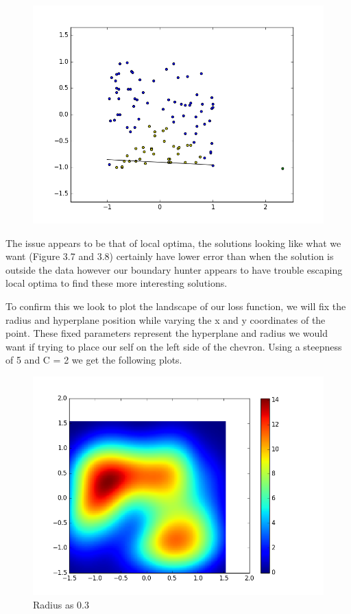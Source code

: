 \documentclass[notitlepage]{report}
\theoremstyle{definition}
\begin{document}
\begin{figure}[H]
  \centering
  \begin{minipage}[b]{0.5\textwidth}
    \includegraphics[width=\textwidth]{BoundaryHunter-Attempt3-R2.png}
    \caption{}
  \end{minipage}
  \hfill
\end{figure}

The issue appears to be that of local optima, the solutions looking like what we want (Figure 3.7 and 3.8) certainly have lower error than when the solution is outside the data however our boundary hunter appears to have trouble escaping local optima to find these more interesting solutions.

To confirm this we look to plot the landscape of our loss function, we will fix the radius and hyperplane position while varying the x and y coordinates of the point. These fixed parameters represent the hyperplane and radius we would want if trying to place our self on the left side of the chevron. Using a steepness of 5 and C = 2 we get the following plots.

\begin{figure}[H]
  \centering
  \begin{minipage}[b]{0.8\textwidth}
    \includegraphics[width=\textwidth]{LossPlot-1.png}
    \caption{Radius as 0.3}
  \end{minipage}
  \hfill
\end{figure}
\end{document}
